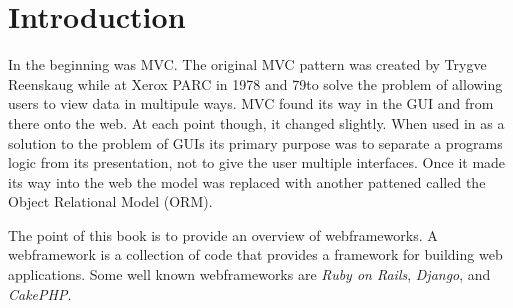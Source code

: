 \chapter{Introduction}

In the beginning was MVC. The original MVC pattern was created by Trygve
Reenskaug while at Xerox PARC in 1978 and 79\footnotemark[1] to solve
the problem of allowing users to view data in multipule ways. MVC found
its way in the GUI and from there onto the web. At each point though, it
changed slightly. When used in as a solution to the problem of GUIs its
primary purpose was to separate a programs logic from its presentation,
not to give the user multiple interfaces. Once it made its way into the
web the model was replaced with another pattened called the Object
Relational Model (ORM).

The point of this book is to provide an overview of webframeworks.
A webframework is a collection of code that provides a framework for
building web applications. Some well known webframeworks are \emph{Ruby
on Rails}, \emph{Django}, and \emph{CakePHP}.

